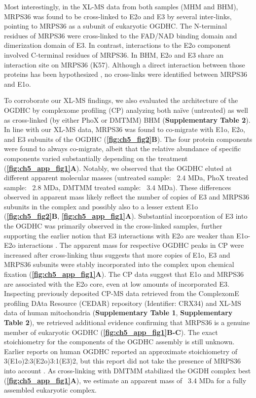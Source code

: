 Most interestingly, in the XL-MS data from both samples (MHM and BHM), MRPS36 was found to be cross-linked to E2o and E3 by several inter-links, pointing to MRPS36 as a subunit of eukaryotic OGDHC. The N-terminal residues of MRPS36 were cross-linked to the FAD/NAD binding domain and dimerization domain of E3. In contrast, interactions to the E2o component involved C-terminal residues of MRPS36. In BHM, E2o and E3 share an interaction site on MRPS36 (K57). Although a direct interaction between those proteins has been hypothesized \cite{Heublein_2014}, no cross-links were identified between MRPS36 and E1o.

To corroborate our XL-MS findings, we also evaluated the architecture of the OGDHC by complexome profiling (CP) analyzing both naïve (untreated) as well as cross-linked (by either PhoX or DMTMM) BHM (\textbf{Supplementary Table 2}). In line with our XL-MS data, MRPS36 was found to co-migrate with E1o, E2o, and E3 subunits of the OGDHC (\textbf{\autoref{fig:ch5_fig2}B}). The four protein components were found to always co-migrate, albeit that the relative abundance of specific components varied substantially depending on the treatment (\textbf{\autoref{fig:ch5_app_fig1}A}). Notably, we observed that the OGDHC eluted at different apparent molecular masses (untreated sample: ~2.4 MDa, PhoX treated sample: ~2.8 MDa, DMTMM treated sample: ~3.4 MDa). These differences observed in apparent mass likely reflect the number of copies of E3 and MRPS36 subunits in the complex and possibly also to a lesser extent E1o (\textbf{\autoref{fig:ch5_fig2}B}, \textbf{\autoref{fig:ch5_app_fig1}A}). Substantial incorporation of E3 into the OGDHC was primarily observed in the cross-linked samples, further supporting the earlier notion that E3 interactions with E2o are weaker than E1o-E2o interactions \cite{Zhou_2018}. The apparent mass for respective OGDHC peaks in CP were increased after cross-linking thus suggests that more copies of E1o, E3 and MRPS36 subunits were stably incorporated into the complex upon chemical fixation (\textbf{\autoref{fig:ch5_app_fig1}A}). The CP data suggest that E1o and MRPS36 are associated with the E2o core, even at low amounts of incorporated E3. Inspecting previously deposited CP-MS data retrieved from the ComplexomE profiling DAta Resource (CEDAR) repository \cite{Strien_2021} (Identifier: CRX34) and XL-MS data of human mitochondria \cite{Ryl_2020} (\textbf{Supplementary Table 1}, \textbf{Supplementary Table 2}), we retrieved additional evidence confirming that MRPS36 is a genuine member of eukaryotic OGDHC (\textbf{\autoref{fig:ch5_app_fig1}B-C}). The exact stoichiometry for the components of the OGDHC assembly is still unknown. Earlier reports on human OGDHC reported an approximate stoichiometry of 3(E1o)2:3(E2o)3:1(E3)2, but this report did not take the presence of MRPS36 into account \cite{Zhou_2018}. As cross-linking with DMTMM stabilized the OGDH complex best (\textbf{\textbf{\autoref{fig:ch5_app_fig1}A}}), we estimate an apparent mass of ~3.4 MDa for a fully assembled eukaryotic complex.

